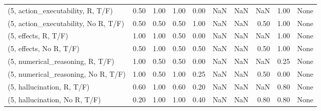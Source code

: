 \begin{table*}[h!]
\begin{adjustbox}{width=2\columnwidth,center}
\begin{tabular}{lrrr|rrr|rrr}
(5, action\_executability, R, T/F)    &                      0.50 &                  1.00 &                      1.00 &                          0.00 &                       NaN &                           NaN &                                    NaN &                               1.00 &                                  None \\
(5, action\_executability, No R, T/F) &                      0.50 &                  0.50 &                      0.50 &                          1.00 &                       NaN &                           NaN &                                   0.50 &                               1.00 &                                  None \\
(5, effects, R, T/F)                 &                      1.00 &                  1.00 &                      0.50 &                          0.00 &                       NaN &                           NaN &                                    NaN &                               1.00 &                                  None \\
(5, effects, No R, T/F)              &                      0.50 &                  1.00 &                      0.50 &                          0.50 &                       NaN &                           NaN &                                   0.50 &                               1.00 &                                  None \\
(5, numerical\_reasoning, R, T/F)     &                      1.00 &                  0.50 &                      0.50 &                          0.00 &                       NaN &                           NaN &                                    NaN &                               0.25 &                                  None \\
(5, numerical\_reasoning, No R, T/F)  &                      1.00 &                  0.50 &                      1.00 &                          0.25 &                       NaN &                           NaN &                                   0.50 &                               0.00 &                                  None \\
(5, hallucination, R, T/F)           &                      0.60 &                  1.00 &                      0.60 &                          0.20 &                       NaN &                           NaN &                                    NaN &                               0.80 &                                  None \\
(5, hallucination, No R, T/F)        &                      0.20 &                  1.00 &                      1.00 &                          0.40 &                       NaN &                           NaN &                                   0.80 &                               0.80 &                                  None \\

\end{tabular}
\end{adjustbox}
\end{table*}
